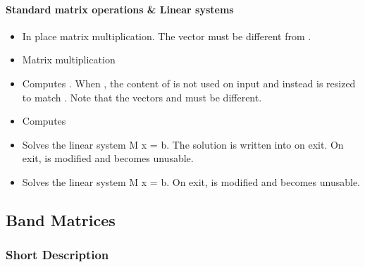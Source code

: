 \paragraph{Standard matrix operations \& Linear systems}
\begin{itemize}
  \item {}
    \sshortdescribe In place matrix multiplication. The vector  must be
    different from .
  \item {}
    \sshortdescribe Matrix multiplication  
  \item {} 
    \sshortdescribe Computes . When , the
    content of  is not used on input and instead  is resized to
    match . Note that the vectors  and  must be different.
  \item {}
    \sshortdescribe Computes 
  \item {}
    \sshortdescribe Solves the linear system M x = b. The solution is written into
     on exit. On exit,  is modified and becomes unusable.
  \item {}
    \sshortdescribe Solves the linear system M x = b. On exit,  is modified and becomes unusable.
\end{itemize}



\subsection{Band Matrices}
\subsubsection{Short Description}

